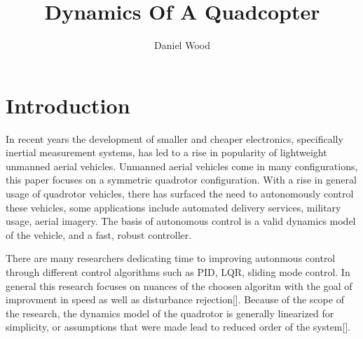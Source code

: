 \documentclass[9pt]{article}
\begin{document}
\title{Dynamics Of A Quadcopter}
\author{Daniel Wood}
\maketitle
\section{Introduction}

In recent years the development of smaller and cheaper electronics, specifically inertial measurement systems, has led to a rise in popularity of lightweight unmanned aerial vehicles. Unmanned aerial vehicles come in many configurations, this paper focuses on a symmetric quadrotor configuration. With a rise in general usage of quadrotor vehicles, there has surfaced the need to autonomously control these vehicles, some applications include automated delivery services, military usage, aerial imagery. The basis of autonomous control is a valid dynamics model of the vehicle, and a fast, robust controller.

There are many researchers dedicating time to improving autonmous control through different control algorithms such as PID, LQR, sliding mode control. In general this research focuses on nuances of the choosen algoritm with the goal of improvment in speed as well as disturbance rejection[]. Because of the scope of the research, the dynamics model of the quadrotor is generally linearized for simplicity, or assumptions that were made lead to reduced order of the system[].
\end{document}
